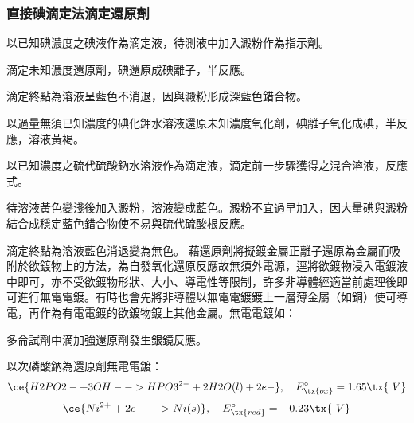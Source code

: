 \documentclass[a4paper,12pt]{article}
\begin{document}
\subsubsection{直接碘滴定法滴定還原劑}
\ben
\item 以已知碘濃度之碘液作為滴定液，待測液中加入澱粉作為指示劑。
\item 滴定未知濃度還原劑，碘還原成碘離子，半反應。
\item 滴定終點為溶液呈藍色不消退，因與澱粉形成深藍色錯合物。
\een
{}
\ben
\item 以過量無須已知濃度的碘化鉀水溶液還原未知濃度氧化劑，碘離子氧化成碘，半反應，溶液黃褐。
\item 以已知濃度之硫代硫酸鈉水溶液作為滴定液，滴定前一步驟獲得之混合溶液，反應式。
\item 待溶液黃色變淺後加入澱粉，溶液變成藍色。澱粉不宜過早加入，因大量碘與澱粉結合成穩定藍色錯合物使不易與硫代硫酸根反應。
\item 滴定終點為溶液藍色消退變為無色。
\een
{}
藉還原劑將擬鍍金屬正離子還原為金屬而吸附於欲鍍物上的方法，為自發氧化還原反應故無須外電源，逕將欲鍍物浸入電鍍液中即可，亦不受欲鍍物形狀、大小、導電性等限制，許多非導體經適當前處理後即可進行無電電鍍。有時也會先將非導體以無電電鍍鍍上一層薄金屬（如銅）使可導電，再作為有電電鍍的欲鍍物鍍上其他金屬。無電電鍍如：
\bit
\item 多侖試劑中滴加強還原劑發生銀鏡反應。
\item 以次磷酸鈉為還原劑無電電鍍：
\[\ce{H2PO2- + 3OH- -> HPO3^{2-} + 2H2O(l) + 2e-},\quad E^{\circ}_{\tx{ox}}=1.65 \tx{\ V}\]
\[\ce{Ni^{2+} + 2e- -> Ni(s)},\quad E^{\circ}_{\tx{red}}=-0.23 \tx{\ V}\]
\eit
\end{document}
